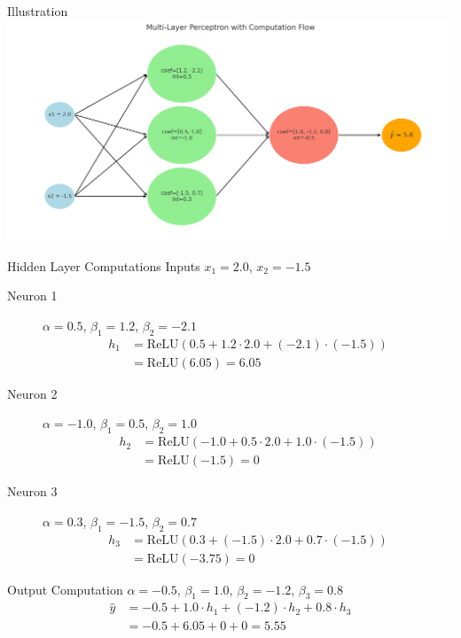 \documentclass[10pt]{beamer}
\begin{document}
    \begin{frame}{Illustration}
 \includegraphics[width=1.15\textwidth]{../images/net2.png}

\end{frame}

\begin{frame}{Hidden Layer Computations}
    Inputs $x_1 = 2.0$, $x_2 = -1.5$
    
    \begin{description}
    \item[Neuron 1] $\alpha = 0.5$, $\beta_1 = 1.2$, $\beta_2 = -2.1$
    \begin{align*}
    h_1 &= \text{ReLU}(0.5 + 1.2 \cdot 2.0 + (-2.1) \cdot (-1.5)) \\
            &= \text{ReLU}(6.05) = 6.05
    \end{align*}
      
     \item[Neuron 2] $\alpha = -1.0$, $\beta_1 = 0.5$, $\beta_2 = 1.0$
    \begin{align*}
    h_2 &= \text{ReLU}(-1.0 + 0.5 \cdot 2.0 + 1.0 \cdot (-1.5)) \\
        &= \text{ReLU}(-1.5) = 0
    \end{align*}

    \item[Neuron 3] $\alpha = 0.3$, $\beta_1 = -1.5$, $\beta_2 = 0.7$
    \begin{align*}
    h_3 &= \text{ReLU}(0.3 + (-1.5) \cdot 2.0 + 0.7 \cdot (-1.5)) \\
        &= \text{ReLU}(-3.75) = 0
    \end{align*}
    \end{description}
    \end{frame}
    
    \begin{frame}{Output Computation}
         $\alpha = -0.5$, $\beta_1 = 1.0$, $\beta_2 = -1.2$, $\beta_3 = 0.8$
    \begin{align*}
    \hat{y} &= -0.5 + 1.0 \cdot h_1 + (-1.2) \cdot h_2 + 0.8 \cdot h_3 \\
            &= -0.5 + 6.05 + 0 + 0 = \boxed{5.55}
    \end{align*}
    \end{frame}
    
\end{document}
